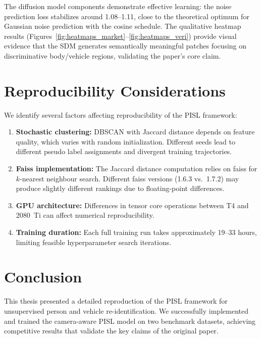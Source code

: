 The diffusion model components demonstrate effective learning: the noise prediction loss stabilizes around 1.08--1.11, close to the theoretical optimum for Gaussian noise prediction with the cosine schedule. The qualitative heatmap results (Figures~\ref{fig:heatmaps_market}--\ref{fig:heatmaps_veri}) provide visual evidence that the SDM generates semantically meaningful patches focusing on discriminative body/vehicle regions, validating the paper's core claim.

\section{Reproducibility Considerations}

We identify several factors affecting reproducibility of the PISL framework:

\begin{enumerate}
    \item \textbf{Stochastic clustering:} DBSCAN with Jaccard distance depends on feature quality, which varies with random initialization. Different seeds lead to different pseudo label assignments and divergent training trajectories.
    \item \textbf{Faiss implementation:} The Jaccard distance computation relies on faiss for $k$-nearest neighbour search. Different faiss versions (1.6.3 vs.\ 1.7.2) may produce slightly different rankings due to floating-point differences.
    \item \textbf{GPU architecture:} Differences in tensor core operations between T4 and 2080~Ti can affect numerical reproducibility.
    \item \textbf{Training duration:} Each full training run takes approximately 19--33 hours, limiting feasible hyperparameter search iterations.
\end{enumerate}

\section{Conclusion}

This thesis presented a detailed reproduction of the PISL framework \cite{tao2024unsupervised} for unsupervised person and vehicle re-identification. We successfully implemented and trained the camera-aware PISL model on two benchmark datasets, achieving competitive results that validate the key claims of the original paper.

